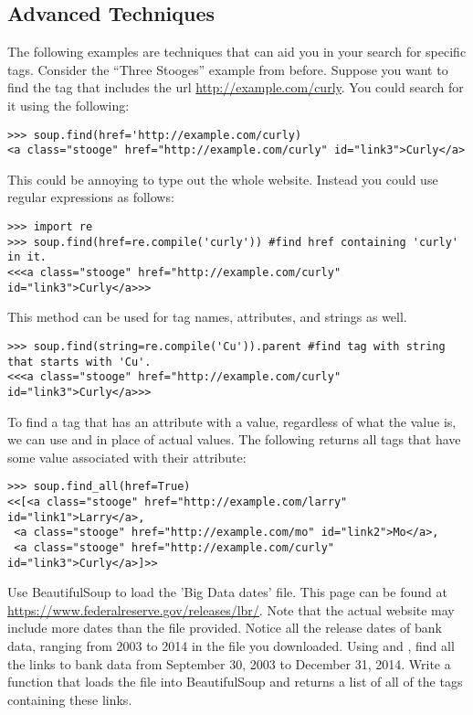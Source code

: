 \subsection*{Advanced Techniques}
The following examples are techniques that can aid you in your search for specific tags.
Consider the ``Three Stooges'' example from before.
Suppose you want to find the tag that includes the url \url{http://example.com/curly}.
You could search for it using the following:
\begin{lstlisting}
>>> soup.find(href='http://example.com/curly)
<a class="stooge" href="http://example.com/curly" id="link3">Curly</a>
\end{lstlisting}
This could be annoying to type out the whole website.
Instead you could use regular expressions as follows:
\begin{lstlisting}
>>> import re
>>> soup.find(href=re.compile('curly')) #find href containing 'curly' in it.
<<<a class="stooge" href="http://example.com/curly" id="link3">Curly</a>>>
\end{lstlisting}
This method can be used for tag names, attributes, and strings as well.
\begin{lstlisting}
>>> soup.find(string=re.compile('Cu')).parent #find tag with string that starts with 'Cu'.
<<<a class="stooge" href="http://example.com/curly" id="link3">Curly</a>>>
\end{lstlisting}

To find a tag that has an attribute with a value, regardless of what the value is, we can use  and  in place of actual values.
The following returns all tags that have some value associated with their  attribute:
\begin{lstlisting}
>>> soup.find_all(href=True)
<<[<a class="stooge" href="http://example.com/larry" id="link1">Larry</a>,
 <a class="stooge" href="http://example.com/mo" id="link2">Mo</a>,
 <a class="stooge" href="http://example.com/curly" id="link3">Curly</a>]>>
\end{lstlisting}

\begin{problem}

Use BeautifulSoup to load the 'Big Data dates' file.
This page can be found at \url{https://www.federalreserve.gov/releases/lbr/}.
Note that the actual website may include more dates than the file provided.
Notice all the release dates of bank data, ranging from 2003 to 2014 in the file you downloaded.
Using  and , find all the links to bank data from September 30, 2003 to December 31, 2014.
Write a function that loads the file into BeautifulSoup and returns a list of all of the tags containing these links.

\end{problem}
